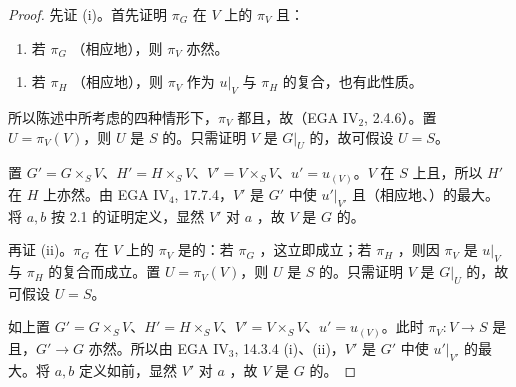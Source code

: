 \begin{proof}
先证 (i)。首先证明 $\pi_G$ 在 $V$ 上的 $\pi_V$ 且：
\begin{enumerate}
\item[a)] 若 $\pi_G$ （相应地），则 $\pi_V$ 亦然。
\end{enumerate}
\begin{enumerate}
\item[b)] 若 $\pi_H$ （相应地），则 $\pi_V$ 作为 $u|_V$ 与 $\pi_H$ 的复合，也有此性质。
\end{enumerate}
所以陈述中所考虑的四种情形下，$\pi_V$ 都且，故（EGA IV$_2$, 2.4.6）。置 $U=\pi_V(V)$，则 $U$ 是 $S$ 的。只需证明 $V$ 是 $G|_U$ 的，故可假设 $U=S$。

置 $G'=G\times_SV$、$H'=H\times_SV$、$V'=V\times_SV$、$u'=u_{(V)}$。$V$ 在 $S$ 上且，所以 $H'$ 在 $H$ 上亦然。由 EGA IV$_4$, 17.7.4，$V'$ 是 $G'$ 中使 $u'|_{V'}$ 且（相应地、）的最大。将 $a,b$ 按 2.1 的证明定义，显然 $V'$ 对 $a$ ，故 $V$ 是 $G$ 的。

再证 (ii)。$\pi_G$ 在 $V$ 上的 $\pi_V$ 是的：若 $\pi_G$ ，这立即成立；若 $\pi_H$ ，则因 $\pi_V$ 是 $u|_V$ 与 $\pi_H$ 的复合而成立。置 $U=\pi_V(V)$，则 $U$ 是 $S$ 的。只需证明 $V$ 是 $G|_U$ 的，故可假设 $U=S$。

如上置 $G'=G\times_SV$、$H'=H\times_SV$、$V'=V\times_SV$、$u'=u_{(V)}$。此时 $\pi_V:V\to S$ 是且，$G'\to G$ 亦然。所以由 EGA IV$_3$, 14.3.4 (i)、(ii)，$V'$ 是 $G'$ 中使 $u'|_{V'}$ 的最大。将 $a,b$ 定义如前，显然 $V'$ 对 $a$ ，故 $V$ 是 $G$ 的。
\end{proof}
